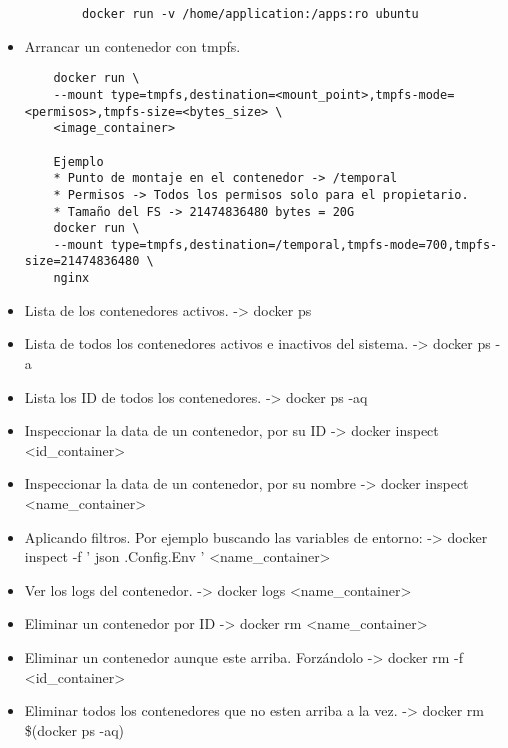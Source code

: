 \documentclass{article}
\begin{document}
\begin{itemize}
\begin{lstlisting}
        docker run -v /home/application:/apps:ro ubuntu
    \end{lstlisting}
    \item  Arrancar un contenedor con tmpfs. 
    \begin{lstlisting}
    docker run \
    --mount type=tmpfs,destination=<mount_point>,tmpfs-mode=<permisos>,tmpfs-size=<bytes_size> \
    <image_container>
    
    Ejemplo
    * Punto de montaje en el contenedor -> /temporal
    * Permisos -> Todos los permisos solo para el propietario.
    * Tamaño del FS -> 21474836480 bytes = 20G
    docker run \
    --mount type=tmpfs,destination=/temporal,tmpfs-mode=700,tmpfs-size=21474836480 \
    nginx
    \end{lstlisting}
    \item Lista de los contenedores activos. -> docker ps
    \item Lista de todos los contenedores activos e inactivos del sistema. -> docker ps -a
    \item Lista los ID de todos los contenedores. -> docker ps -aq
    \item Inspeccionar la data de un contenedor, por su ID -> docker inspect <id\_container>
    \item Inspeccionar la data de un contenedor, por su nombre -> docker inspect <name\_container>
    \item Aplicando filtros. Por ejemplo buscando las variables de entorno: -> docker inspect -f '{{ json .Config.Env }}' <name\_container>
    \item Ver los logs del contenedor. -> docker logs <name\_container>
    \item Eliminar un contenedor por ID -> docker rm <name\_container>
    \item Eliminar un contenedor aunque este arriba. Forzándolo -> docker rm -f <id\_container>
    \item Eliminar todos los contenedores que no esten arriba a la vez. -> docker rm \$(docker ps -aq)



\end{itemize}
\end{document}

